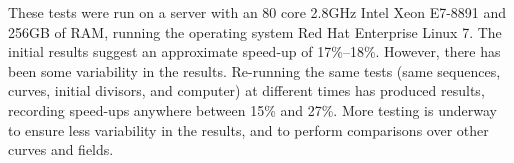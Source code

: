 These tests were run on a server with an 80 core 2.8GHz Intel Xeon E7-8891 and 256GB of RAM,
running the operating system Red Hat Enterprise Linux 7.
The initial results suggest an approximate speed-up of 17\%--18\%.
However, there has been some variability in the results.
Re-running the same tests (same sequences, curves, initial divisors, and computer)
at different times has produced results, recording speed-ups anywhere between 15\% and 27\%.
More testing is underway to ensure less variability in the results,
and to perform comparisons over other curves and fields.





